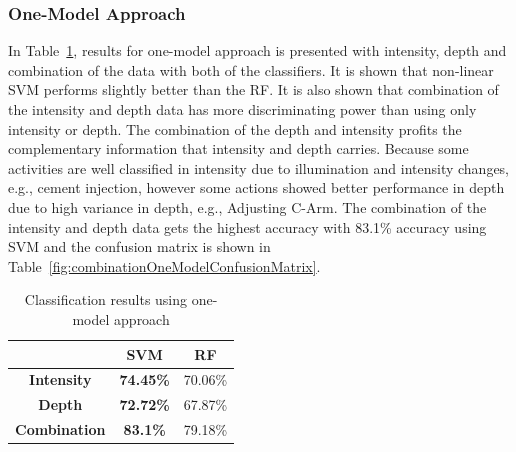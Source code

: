 \documentclass[a4paper, 10pt, conference]{ieeeconf}      %
\begin{document}
\subsubsection{One-Model Approach}
\label{section:OneModelExperiments}
In Table~\ref{table:oneModelResults}, results for one-model approach is presented with intensity, depth and combination of the data with both of the classifiers. It is shown that non-linear SVM performs slightly better than the RF. It is also shown that combination of the intensity and depth data has more discriminating power than using only intensity or depth. The combination of the depth and intensity profits the complementary information that intensity and depth carries. Because some activities are well classified in intensity due to illumination and intensity changes, e.g., cement injection, however some actions showed better performance in depth due to high variance in depth, e.g., Adjusting C-Arm. The combination of the intensity and depth data gets the highest accuracy with 83.1\% accuracy using SVM and the confusion matrix is shown in Table~\ref{fig:combinationOneModelConfusionMatrix}.


\begin{table}[h]
\centering
\begin{tabular}{|c|c|c|}
\hline
                     & \textbf{SVM}     & \textbf{RF} \\ \hline
\textbf{Intensity}   & \textbf{74.45\%} & 70.06\%     \\ \hline
\textbf{Depth}       & \textbf{72.72\%} & 67.87\%     \\ \hline
\textbf{Combination} & \textbf{83.1\%}  & 79.18\%     \\ \hline
\end{tabular}
\caption{Classification results using one-model approach}
\label{table:oneModelResults}
\end{table}

        
\end{document}
